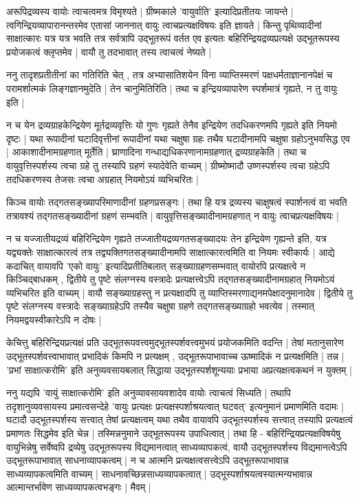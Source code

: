 अरूपिद्रव्यस्य वायोः त्वाचत्वमत्र विमृश्यते | ग्रीष्मकाले 'वायुर्वाति' इत्यादिप्रतीतयः जायन्ते | त्वगिन्द्रियव्यापारानन्तरमेव एतासां जाननात् वायुः त्वाचप्रत्यक्षविषयः इति ज्ञायते | किन्तु पृथिव्यादीनां साक्षात्कारः यत्र यत्र भवति तत्र सर्वत्रापि उद्भूतरूपं वर्तत एव इत्यतः बहिरिन्द्रियद्रव्यप्रत्यक्षे उद्भूतरूपस्य प्रयोजकत्वं क्लृप्तमेव | वायौ तु तदभावात् तस्य त्वाचत्वं नेष्यते | 

ननु तादृशप्रतीतीनां का गतिरिति चेत् , तत्र अभ्यासातिशयेन विना व्याप्तिस्मरणं पक्षधर्मताज्ञानानपेक्षं च परामर्शात्मकं लिङ्गज्ञानमुदेति | तेन चानुमितिरिति | तथा च इन्द्रियव्यापारेण स्पर्शमात्रं गृह्यते, न तु वायुः‌ इति |

न च येन द्रव्यग्राहकेन्द्रियेण मूर्तद्रव्यवृत्तिः‌ यो गुणः गृह्यते तेनैव इन्द्रियेण तदधिकरणमपि गृह्यते इति नियमो दृष्टः | यथा रूपादीनां घटादिवृत्तीनां रूपादीनां यथा चक्षुषा ग्रहः तथैव घटादीनामपि चक्षुषा ग्रहोऽनुभवसिद्ध एव | आकाशादीनामग्रहणात् मूर्तेति | घ्राणादिना गन्धाद्यधिकरणानामग्रहणात् द्रव्यग्राहकेति | तथा च  वायुवृत्तिस्पर्शस्य त्वचा ग्रहे तु तस्यापि ग्रहणं स्यादेवेति वाच्यम् | ग्रीष्मोष्मादौ उष्णस्पर्शस्य त्वचा ग्रहेऽपि तदधिकरणस्य तेजसः त्वचा अग्रहात् नियमोऽयं व्यभिचरितः | 

किञ्च वायोः तद्गतसङ्ख्यापरिमाणादीनां ग्रहणप्रसङ्गः | तथा हि यत्र द्रव्यस्य चाक्षुषत्वं स्पार्शनत्वं वा भवति तत्रावश्यं तद्गतसङ्ख्यादीनां ग्रहणं सम्भवति | वायुवृत्तिसङ्ख्यादीनामग्रहणात् न वायुः त्वाचप्रत्यक्षविषयः |

न च यज्जातीयद्रव्यं बहिरिन्द्रियेण गृह्यते तज्जातीयद्रव्यगतसङ्ख्यादयः तेन इन्द्रियेण गृह्यन्ते इति, यत्र यद्व्यक्तेः साक्षात्कारत्वं तत्र तद्व्यक्तिगतसङ्ख्यादीनामपि साक्षात्कारत्वमिति वा नियमः स्वीकार्यः | आद्ये कदाचित् वायावपि 'एको वायुः' इत्यादिप्रतीतिबलात् सङ्ख्याग्रहणसम्भवात् वायोरपि प्रत्यक्षत्वे न किञ्चिद्बाधकम् , द्वितीये तु पृष्टे संलग्नस्य वस्त्रादेः प्रत्यक्षत्त्वेऽपि तद्गतसङ्ख्यादीनामग्रहात् नियमोऽयं व्यभिचरित इति वाच्यम् | वायौ सङ्ख्याग्रहस्तु न प्रत्यक्षादपि तु  व्याप्तिस्मरणाद्यनमपेक्षादनुमानादेव | द्वितीये तु पृष्टे संलग्नस्य वस्त्रादेः‌ सङ्ख्याग्रहेऽपि तस्यैव चक्षुषा ग्रहणे तद्गतसङ्ख्याग्रहो भवत्येव |‌ तस्मात् नियमद्वयस्वीकारेऽपि न दोषः | 

केचित्तु बहिरिन्द्रियप्रत्यक्षं प्रति उद्भूतरूपवत्त्वमुद्भूतस्पर्शवत्त्वमुभयं प्रयोजकमिति वदन्ति | तेषां मतानुसारेण उद्भूतस्पर्शवत्त्वाभावात् प्रभादिकं किमपि न प्रत्यक्षम् , उद्भूतरूपाभावाच्च ऊष्मादिकं न प्रत्यक्षमिति | तन्न | 'प्रभां साक्षात्करोमि' इति अनुव्यवसायबलात् सिद्धाया उद्भूतस्पर्शशून्ययाः प्रभाया अप्रत्यक्षत्वकथनं न युक्तम् |

ननु यद्यपि 'वायुं साक्षात्करोमि' इति अनुव्यावसायवशादेव वायोः त्वाचत्वं सिध्यति | तथापि तदृशानुव्यवसायस्य प्रमात्वसन्देहे 'वायुः प्रत्यक्षः प्रत्यक्षस्पर्शाश्रयत्वात् घटवत्' इत्यनुमानं प्रमाणमिति वदामः | घटादौ उद्भूतस्पर्शस्य सत्त्वात् तेषां प्रत्यक्षत्वम् यथा तथैव वायावपि उद्भूतस्पर्शस्य सत्त्वात् तस्यापि प्रत्यक्षत्वं प्रमाणतः सिद्धमेव इति चेन्न | तस्मिन्ननुमाने उद्भूतरूपस्य उपाधित्वात् | तथा हि - बहिरिन्द्रियप्रत्यक्षविषयेषु वायुभिन्नेषु सर्वेष्वपि द्रव्येषु उद्भूतरूपस्य विद्यमानत्वात् साध्यव्यापकत्वं, वायौ उद्भूतस्पर्शस्य विद्यमानत्वेऽपि उद्भूतरूपाभावात् साधनाव्यापकत्वम्  | न च आत्मनि प्रत्यक्षत्वसत्त्वेऽपि उद्भूतरूपाभावान्न साध्यव्यापकत्वमिति वाच्यम् | साधनावच्छिन्नसाध्यव्यापकत्वात् | उद्भूस्पर्शाश्रयत्वस्यात्मन्यभावान्न आत्मान्तर्भावेण साध्यव्यापकत्वभङ्गः | मैवम् |

